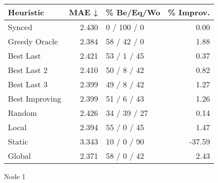 \begin{tabular}{lrlr}
\toprule
\textbf{Heuristic} & \textbf{MAE ↓} & \textbf{\% Be/Eq/Wo} & \textbf{\% Improv.} \\
\midrule
            Synced &          2.430 &          0 / 100 / 0 &                0.00 \\
     Greedy Oracle &          2.384 &          58 / 42 / 0 &                1.88 \\
         Best Last &          2.421 &          53 / 1 / 45 &                0.37 \\
       Best Last 2 &          2.410 &          50 / 8 / 42 &                0.82 \\
       Best Last 3 &          2.399 &          49 / 8 / 42 &                1.27 \\
    Best Improving &          2.399 &          51 / 6 / 43 &                1.26 \\
            Random &          2.426 &         34 / 39 / 27 &                0.14 \\
             Local &          2.394 &          55 / 0 / 45 &                1.47 \\
            Static &          3.343 &          10 / 0 / 90 &              -37.59 \\
            Global &          2.371 &          58 / 0 / 42 &                2.43 \\
\bottomrule
\end{tabular}
\caption{Node 1}
\label{tab:hr_non_lr01_le1_bs2_1}
